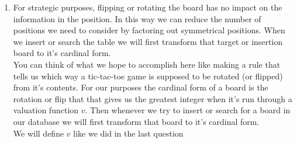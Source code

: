 \documentclass[11pt]{article}
\begin{document}
\begin{enumerate}
\begin{enumerate}
		\item
			For strategic purposes, flipping or rotating the
			board has no impact on the information in the position.
			In this way we can reduce the number of positions we need to
			consider by factoring out symmetrical positions.
			When we insert or search the table we will first
				transform that target or insertion board to it's
				cardinal form.\\
			You can think of what we hope to accomplish here like
			making a rule that tells us which way a tic-tac-toe game
			is supposed to be rotated (or flipped) from it's contents.
			For our purposes the cardinal form of a board is the
			rotation or flip that that gives us the greatest integer
			when it's run through a valuation function $v$.
			Then whenever we try to insert or search for a board in
			our database we will first transform that board to it's
			cardinal form. \\
			We will define $v$ like we did in the last question

\end{enumerate}
\end{enumerate}
\end{document}
